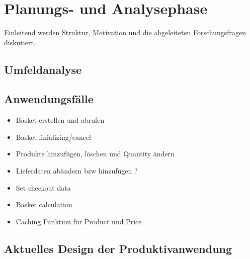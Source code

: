 

\chapter{Planungs- und Analysephase}

Einleitend werden Struktur, Motivation und die abgeleiteten Forschungsfragen diskutiert.

\section{Umfeldanalyse}
\blindtext

\section{Anwendungsfälle}

\begin{itemize}[noitemsep,nolistsep]
	\item Basket erstellen und abrufen
	\item Basket finializing/cancel
	\item Produkte hinzufügen, löschen und Quantity ändern
	\item Lieferdaten abändern bzw hinzufügen ?
	\item Set checkout data
	\item Basket calculation
\end{itemize}

\begin{itemize}[noitemsep,nolistsep]
	\item Caching Funktion für Product und Price
\end{itemize}

\blindtext


\section{Aktuelles Design der Produktivanwendung}
\blindtext
